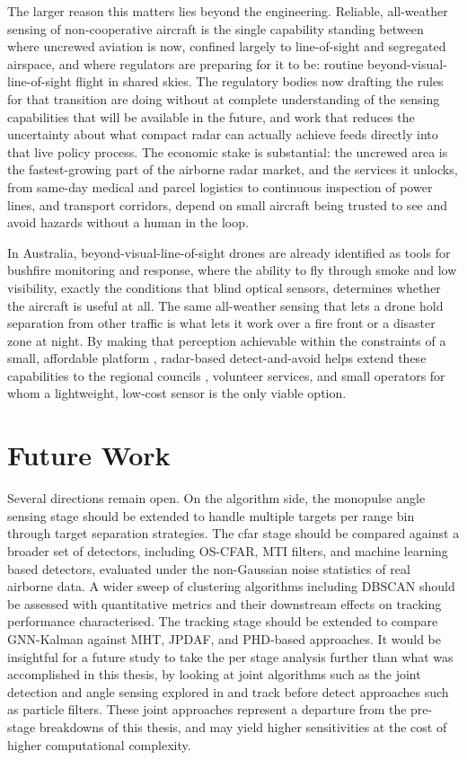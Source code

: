 The larger reason this matters lies beyond the engineering. Reliable, all-weather 
sensing of non-cooperative aircraft is the single capability standing between where 
uncrewed aviation is now, confined largely to line-of-sight and segregated airspace, 
and where regulators are preparing for it to be: routine beyond-visual-line-of-sight 
flight in shared skies. The regulatory bodies now drafting the rules for that 
transition are doing without at complete understanding of the sensing capabilities 
that will be available in the future, and 
work that reduces the uncertainty about what compact radar can actually achieve feeds 
directly into that live policy process. The economic stake is substantial: the uncrewed 
area is the fastest-growing part of the airborne radar market, and the services it 
unlocks, from same-day medical and parcel logistics to continuous inspection of power 
lines, and transport corridors, depend on small aircraft being trusted to see and 
avoid hazards without a human in the loop.

In Australia, beyond-visual-line-of-sight drones are already identified as tools for 
bushfire 
monitoring and response, where the ability to fly through smoke and low visibility, 
exactly the conditions that blind optical sensors, determines whether the aircraft is 
useful at all. The same all-weather sensing that lets a drone hold separation from 
other traffic is what lets it work over a fire front or a disaster zone at night. By 
making that perception achievable within the constraints of a small, affordable platform
, radar-based detect-and-avoid helps extend these capabilities to the regional councils
, volunteer services, and small operators for whom a lightweight, low-cost sensor is 
the only viable option.

\section{Future Work}

Several directions remain open. On the algorithm side, the monopulse angle sensing stage
should be extended to handle multiple targets per range bin through target separation
strategies. The \gls{cfar} stage should be compared against a broader set of detectors,
including OS-CFAR, MTI filters, and machine learning based detectors, evaluated under
the non-Gaussian noise statistics of real airborne data. A wider sweep of clustering
algorithms including DBSCAN should be assessed with quantitative metrics and their
downstream effects on tracking performance characterised. The tracking stage should be
extended to compare GNN-Kalman against MHT, JPDAF, and PHD-based approaches. It would 
be insightful for a future study to take the per stage analysis further than what 
was accomplished in this thesis, by looking at joint algorithms such as the joint
detection and angle sensing explored in \cite{an2024_time_varying_angle_estimation_unresolved_extended_targets_monopulse}
and track before detect approaches such as particle filters. These joint approaches 
represent a departure from the pre-stage breakdowns of this thesis, and may yield
higher sensitivities at the cost of higher computational complexity. 

